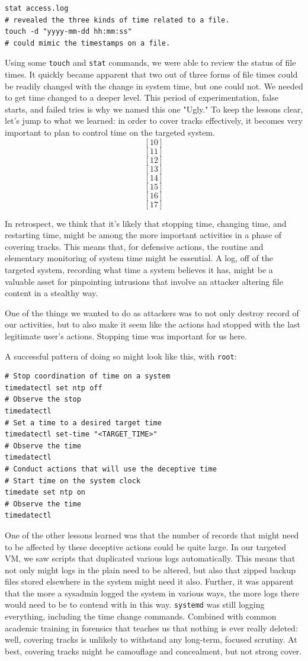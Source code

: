\begin{lstlisting}
stat access.log 
# revealed the three kinds of time related to a file.
touch -d "yyyy-mm-dd hh:mm:ss"
# could mimic the timestamps on a file.
\end{lstlisting}

Using some \texttt{touch} and \texttt{stat} commands, we were able to review the status of file times. It quickly became apparent that two out of three forms of file times could be readily changed with the change in system time, but one could not.  We needed to get time changed to a deeper level.  This period of experimentation, false starts, and failed tries is why we named this one "Ugly."  To keep the lessons clear, let's jump to what we learned:  in order to cover tracks effectively, it becomes very important to plan to control time on the targeted system.  \[[10]\] \[[11]\] \[[12]\] \[[13]\] \[[14]\] \[[15]\] \[[16]\] \[[17]\]


In retrospect, we think that it's likely that stopping time, changing time, and restarting time, might be among the more important activities in a phase of covering tracks.  This means that, for defensive actions, the routine and elementary monitoring of system time might be essential.  A log, off of the targeted system, recording what time a system believes it has, might be a valuable asset for pinpointing intrusions that involve an attacker altering file content in a stealthy way.  

One of the things we wanted to do as attackers was to not only destroy record of our activities, but to also make it seem like the actions had stopped with the last legitimate user's actions.  Stopping time was important for us here.  

A successful pattern of doing so might look like this, with \texttt{root}:
\begin{lstlisting}
# Stop coordination of time on a system
timedatectl set ntp off
# Observe the stop
timedatectl
# Set a time to a desired target time
timedatectl set-time "<TARGET_TIME>"
# Observe the time
timedatectl
# Conduct actions that will use the deceptive time
# Start time on the system clock
timedate set ntp on
# Observe the time
timedatectl
\end{lstlisting}

One of the other lessons learned was that the number of records that might need to be affected by these deceptive actions could be quite large.  In our targeted VM, we saw scripts that duplicated various logs automatically.  This means that not only might logs in the plain need to be altered, but also that zipped backup files stored elsewhere in the system might need it also.  Further, it was apparent that the more a sysadmin logged the system in various ways, the more logs there would need to be to contend with in this way.  \texttt{systemd} was still logging everything, including the time change commands.  Combined with common academic training in forensics that teaches us that nothing is ever really deleted:  well, covering tracks is unlikely to withstand any long-term, focused scrutiny.  At best, covering tracks might be camouflage and concealment, but not strong cover.


